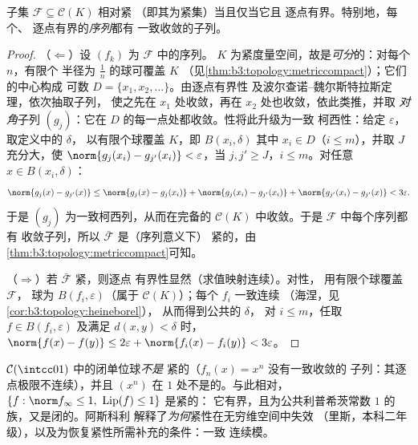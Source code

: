 \begin{theorem}\label{thm:b3:complete:ascoli}
子集 $\mathcal F \subseteq \mathcal C(K)$ 相对紧
（即其为紧集）当且仅当它且
逐点有界。特别地，每个、
逐点有界的\emph{序列}都有
一致收敛的子列。
\end{theorem}

\begin{proof}
（$\Leftarrow$）设 $(f_k)$ 为 $\mathcal F$ 中的序列。
$K$ 为紧度量空间，故是\emph{可分}的：对每个 $n$，有限个
半径为 $\frac1n$ 的球可覆盖 $K$
（见\cref{thm:b3:topology:metriccompact}）；它们的中心构成
可数 $D = \{x_1, x_2, \dots\}$。由逐点有界性
及波尔查诺–魏尔斯特拉斯定理，依次抽取子列，
使之先在 $x_1$ 处收敛，再在 $x_2$ 处也收敛，依此类推，并取
\emph{对角}子列 $(g_j)$：它在
$D$ 的每一点处都收敛。性将此升级为一致
柯西性：给定 $\varepsilon$，取定义中的 $\delta$，
以有限个球覆盖 $K$，即 $B(x_i, \delta)$
其中 $x_i \in D$（$i \leq m$），并取 $J$ 充分大，使
$\norm{g_j(x_i) - g_{j'}(x_i)} < \varepsilon$，当 $j, j' \geq
J$，$i \leq m$。对任意 $x \in B(x_i, \delta)$：
\[
\norm{g_j(x) - g_{j'}(x)}
\leq \norm{g_j(x) - g_j(x_i)} + \norm{g_j(x_i) - g_{j'}(x_i)}
+ \norm{g_{j'}(x_i) - g_{j'}(x)} < 3\varepsilon .
\]
于是 $(g_j)$ 为一致柯西列，从而在完备的
$\mathcal C(K)$ 中收敛。于是 $\mathcal F$ 中每个序列都有
收敛子列，所以 $\bar{\mathcal F}$ 是（序列意义下）
紧的，由\cref{thm:b3:topology:metriccompact}可知。

（$\Rightarrow$）若 $\bar{\mathcal F}$ 紧，则逐点
有界性显然（求值映射连续）。对性，
用有限个球覆盖 $\mathcal F$，
球为 $B(f_i, \varepsilon)$（属于 $\mathcal C(K)$）；每个 $f_i$ 一致连续
（海涅，见\cref{cor:b3:topology:heineborel}），
从而得到公共的 $\delta$，
对 $i \leq m$，任取 $f \in B(f_i, \varepsilon)$ 及满足 $d(x,y)
< \delta$ 时，$\norm{f(x)-f(y)} \leq 2\varepsilon +
\norm{f_i(x)-f_i(y)} < 3\varepsilon$。
\end{proof}

\begin{example}\label{ex:b3:complete:ascoliexamples}
$\mathcal C(\intcc01)$ 中的闭单位球\emph{不是}
紧的（$f_n(x) = x^n$ 没有一致收敛的
子列：其逐点极限不连续），并且
$(x^n)$ 在 $1$ 处不是的。与此相对，$\{f : \norm
f_\infty \leq 1,\ \operatorname{Lip}(f) \leq 1\}$ 是紧的：
它有界，且为公共利普希茨常数 $1$ 的族，又是闭的。阿斯科利
解释了\emph{为何}紧性在无穷维空间中失效
（里斯，本科二年级），以及为恢复紧性所需补充的条件：一致
连续模。
\end{example}

